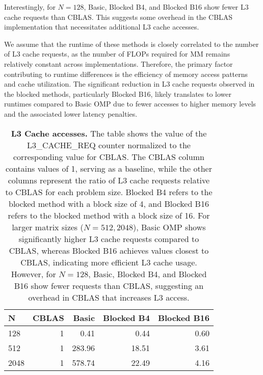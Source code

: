 Interestingly, for \(N = 128\), Basic, Blocked B4, and Blocked B16 show fewer L3 cache requests than CBLAS. This suggests some overhead in the CBLAS implementation that necessitates additional L3 cache accesses.

We assume that the runtime of these methods is closely correlated to the number of L3 cache requests, as the number of FLOPs required for MM remains relatively constant across implementations. Therefore, the primary factor contributing to runtime differences is the efficiency of memory access patterns and cache utilization. The significant reduction in L3 cache requests observed in the blocked methods, particularly Blocked B16, likely translates to lower runtimes compared to Basic OMP due to fewer accesses to higher memory levels and the associated lower latency penalties.

\begin{table}[htbp]
    \centering
    \begin{tabular}{lrrrr}
    \toprule
    N &  CBLAS &  Basic &  Blocked B4 &  Blocked B16 \\
    \midrule
    128  &      1 &  0.41 &       0.44 &         0.60 \\
    512  &      1 & 283.96 &      18.51 &         3.61 \\
    2048 &      1 & 578.74 &      22.49 &         4.16 \\
    \bottomrule
    \end{tabular}
    \caption{\textbf{L3 Cache accesses.} The table shows the value of the L3\_CACHE\_REQ counter normalized to the corresponding value for CBLAS. The CBLAS column contains values of 1, serving as a baseline, while the other columns represent the ratio of L3 cache requests relative to CBLAS for each problem size. Blocked B4 refers to the blocked method with a block size of 4, and Blocked B16 refers to the blocked method with a block size of 16. For larger matrix sizes (\(N = 512, 2048\)), Basic OMP shows significantly higher L3 cache requests compared to CBLAS, whereas Blocked B16 achieves values closest to CBLAS, indicating more efficient L3 cache usage. However, for \(N = 128\), Basic, Blocked B4, and Blocked B16 show fewer requests than CBLAS, suggesting an overhead in CBLAS that increases L3 access.}
    \label{tab:l3-cache}
\end{table}

